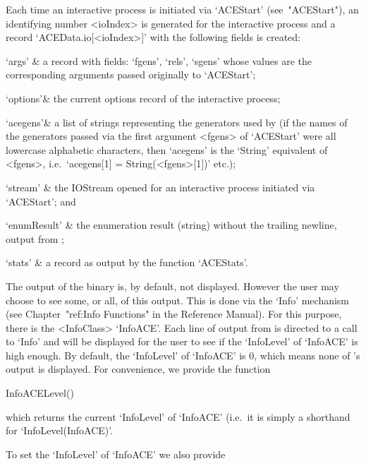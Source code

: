 \enditems

Each time an interactive {\ACE} process is  initiated  via  `ACEStart'
(see~"ACEStart"), an identifying number <ioIndex> is generated for the
interactive process and  a  record  `ACEData.io[<ioIndex>]'  with  the
following fields is created:

\beginitems

\quad`args'   & a record with fields: `fgens', `rels',  `sgens'  whose
values  are  the  corresponding   arguments   passed   originally   to
`ACEStart';

\quad`options'& the current options record of the interactive process;

\quad`acegens'& a list of strings representing the generators used  by
{\ACE} (if the names of the generators passed via the  first  argument
<fgens> of `ACEStart' were all lowercase alphabetic  characters,  then
`acegens' is the `String' equivalent of <fgens>,  i.e.~`acegens[1]   =
String(<fgens>[1])' etc.);

\quad`stream' & the IOStream opened for an interactive {\ACE}  process
initiated via `ACEStart'; and

\quad`enumResult' 
              & the enumeration result (string) without  the  trailing
newline, output from {\ACE};

\quad`stats'  & a record as output by the function `ACEStats'.

\enditems


\beginitems

The output of the {\ACE} binary is, by default, not displayed. However
the user may choose to see some, or all, of this output. This is  done
via the `Info' mechanism  (see  Chapter~"ref:Info  Functions"  in  the
{\GAP} Reference Manual). For this purpose, there is  the  <InfoClass>
`InfoACE'. Each line of output from {\ACE} is directed to  a  call  to
`Info' and will be displayed for the user to see if the `InfoLevel' of
`InfoACE' is high enough. By default, the `InfoLevel' of `InfoACE'  is
0, which means none of {\ACE}'s output is displayed. For  convenience,
we provide the function

\>InfoACELevel()

which returns the current `InfoLevel' of `InfoACE' (i.e.~it is  simply
a shorthand for `InfoLevel(InfoACE)'.

To set the `InfoLevel' of `InfoACE' we also provide

